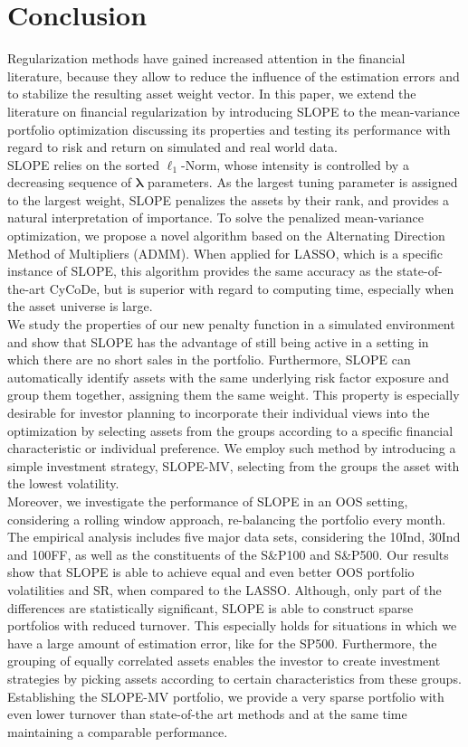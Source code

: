 \documentclass[12pt, a4paper]{article}
\begin{document}
\section{Conclusion} %

Regularization methods have gained increased attention in the financial literature, because they allow to reduce the influence of the estimation errors and to stabilize the resulting asset weight vector. In this paper, we extend the literature on financial regularization by introducing SLOPE to the mean-variance portfolio optimization discussing its properties and testing its performance with regard to risk and return on simulated and real world data.\\
SLOPE relies on the sorted $\ell_{1}$-Norm, whose intensity is controlled by a decreasing sequence of $\boldsymbol{\lambda}$ parameters. As the largest tuning parameter is assigned to the largest weight, SLOPE penalizes the assets by their rank, and provides a natural interpretation of importance. To solve the penalized mean-variance optimization, we propose a novel algorithm based on the Alternating Direction Method of Multipliers (ADMM). When applied for LASSO, which is a specific instance of SLOPE, this algorithm provides the same accuracy as the state-of-the-art CyCoDe, but is superior with regard to computing time, especially when the asset universe is large.\\
We study the properties of our new penalty function in a simulated environment and show that SLOPE has the advantage of still being active in a setting in which there are no short sales in the portfolio. Furthermore, SLOPE can automatically identify assets with the same underlying risk factor exposure and group them together, assigning them the same weight. This property is especially desirable for investor planning to incorporate their individual views into the optimization by selecting assets from the groups according to a specific financial characteristic or individual preference. We employ such method by introducing a simple investment strategy, SLOPE-MV, selecting from the groups the asset with the lowest volatility.\\
Moreover, we investigate the performance of SLOPE in an OOS setting, considering a rolling window approach, re-balancing the portfolio every month. The empirical analysis includes five major data sets, considering the 10Ind, 30Ind and 100FF, as well as the constituents of the S\&P100 and S\&P500. Our results show that SLOPE is able to achieve equal and even better OOS portfolio volatilities and SR, when compared to the LASSO. Although, only part of the differences are statistically significant, SLOPE is able to construct sparse portfolios with reduced turnover. This especially holds for situations in which we have a large amount of estimation error, like for the SP500. Furthermore, the grouping of equally correlated assets enables the investor to create investment strategies by picking assets according to certain characteristics from these groups. Establishing the SLOPE-MV portfolio, we provide a very sparse portfolio with even lower turnover than state-of-the art methods and at the same time maintaining a comparable performance.\\
\end{document}
